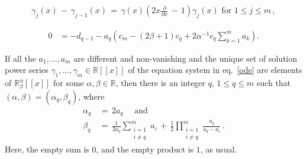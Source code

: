 \documentclass[10pt,a4paper]{amsart}
\newcommand{\R}{{\mathbb{R}}}
\begin{document}
\begin{align} \label{ode} \gamma_j(x) \,-\, \gamma_{j-1}(x) \,= \,\gamma(x) \left( 2 x \frac{\partial}{\partial x} \,-\,1 \right) \gamma_j(x) \text{ for } 1 \leq j \leq m\,, \end{align}

\begin{align} \label{beta_eq} 0 &= - d_{q-1} - a_q \left( c_m - (2 \beta+1) c_q + 2 \alpha^{-1} c_q \sum_{k=1}^m a_k\right). \end{align}

\begin{thm}
\label{thm fixed alpha beta}
If all the $a_1,\ldots,a_m$ are different and non-vanishing and the unique set of solution power series $\gamma_1,\ldots,\gamma_m \in \R[[x]]$ of the equation system in eq.~\eqref{ode} are elements of $\R^\alpha_\beta[[x]]$ for some $\alpha,\beta \in \R$, then there is an integer $q$, $1 \leq q \leq m$ such that $(\alpha,\beta) = (\alpha_q,\beta_q)$, where 
\begin{align} \label{eq:alphas} \alpha_q &\,=\, 2 a_q \quad\text{ and }\\
\label{eq:betas} \beta_q &\,=\, \frac{1}{2 a_q}\sum_{\substack{i=1\\ i\neq q}}^m a_i \,+\, \frac12 \prod_{\substack{i=1\\ i\neq q}}^{m}\frac{a_q}{a_q-a_i}\,. \end{align}
Here, the empty sum is $0$, and the empty product is $1$, as usual.
\end{thm}
\end{document}
